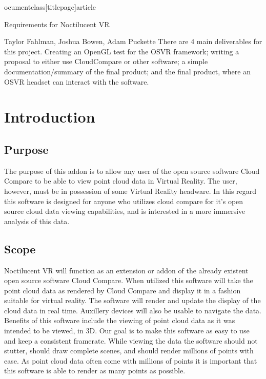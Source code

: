 ocumentclass[titlepage]{article}

\usepackage[T1]{fontenc}
\usepackage[letterpaper, portrait, margin=0.75in]{geometry}
\usepackage[singlespacing]{setspace}
\usepackage{url}
\usepackage{tocloft}
\usepackage{listings}
\usepackage{color}
\setlength{\parindent}{0pt}


\begin{titlepage}
\centering
{\Huge Requirements for Noctilucent VR\par}
{\Large Taylor Fahlman, Joshua Bowen, Adam Puckette}
\abstract
There are 4 main deliverables for this project. Creating an OpenGL test for the OSVR framework;
writing a proposal to either use CloudCompare or other software; a simple documentation/summary of
the final product; and the final product, where an OSVR headset can interact with the software.
\end{titlepage}

\section{Introduction}
\subsection{Purpose}

The purpose of this addon is to allow any user of the open source software Cloud Compare to be able to view point cloud data in Virtual Reality.
The user, however, must be in possession of some Virtual Reality headware. 
In this regard this software is designed for anyone who utilizes cloud compare for it's open source cloud data viewing capabilities,
and is interested in a more immersive analysis of this data.

\subsection{Scope}

Noctilucent VR will function as an extension or addon of the already existent open source software Cloud Compare.
When utilized this software will take the point cloud data as rendered by Cloud Compare and display it in a fashion suitable for virtual reality.
The software will render and update the display of the cloud data in real time.
Auxillery devices will also be usable to navigate the data.
Benefits of this software include the viewing of point cloud data as it was intended to be viewed, in 3D.
Our goal is to make this software as easy to use and keep a consistent framerate.
While viewing the data the software should not stutter,
should draw complete scenes,
and should render millions of points with ease.
As point cloud data often come with millions of points it is important that this software is able to render as many points as possible.

